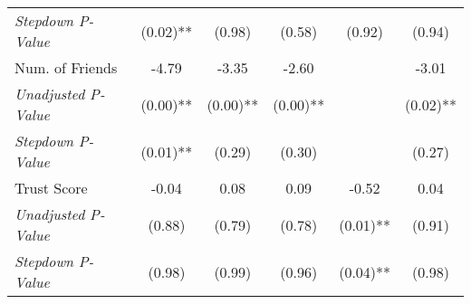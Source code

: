 \begin{tabular}{l c c c c c}
\quad \textit{Stepdown P-Value} & (0.02)** & (0.98) & (0.58) & (0.92) & (0.94) \\
Num. of Friends & -4.79 & -3.35 & -2.60 & & -3.01 \\
\quad \textit{Unadjusted P-Value} & (0.00)** & (0.00)** & (0.00)** & & (0.02)** \\
\quad \textit{Stepdown P-Value} & (0.01)** & (0.29) & (0.30) & & (0.27) \\
Trust Score & -0.04 & 0.08 & 0.09 & -0.52 & 0.04 \\
\quad \textit{Unadjusted P-Value} & (0.88) & (0.79) & (0.78) & (0.01)** & (0.91) \\
\quad \textit{Stepdown P-Value} & (0.98) & (0.99) & (0.96) & (0.04)** & (0.98) \\
\bottomrule
\end{tabular}
